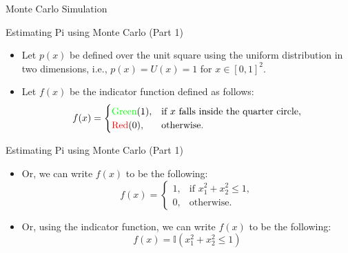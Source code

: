\documentclass{beamer}
\begin{document}
\begin{section}{Monte Carlo Simulation}
\begin{frame}[fragile]{Estimating Pi using Monte Carlo (Part 1)}
        \begin{itemize}
            \item Let $p(x)$ be defined over the unit square using the uniform distribution in two dimensions, i.e., $p(x) = U(x) = 1$ for $x \in [0, 1]^2$.
            \item Let $f(x)$ be the indicator function defined as follows:
                \[
                f(x) = \begin{cases}
                            \text{\textcolor{green}{Green}} (1), & \text{if } x \text{ falls inside the quarter circle}, \\
                            \text{\textcolor{red}{Red}} (0), & \text{otherwise}.
                       \end{cases}
                \]
        \end{itemize}
    \end{frame}

    \begin{frame}[fragile]{Estimating Pi using Monte Carlo (Part 1)}

        \begin{itemize}
        \item Or, we can write $f(x)$ to be the following:
            \[
            f(x) = \begin{cases}
                        1, & \text{if } x_1^2 + x_2^2 \leq 1, \\
                        0, & \text{otherwise}.
                   \end{cases}
            \]
        \item Or, using the indicator function, we can write $f(x)$ to be the following:
            \[
            f(x) = \mathbb{I}(x_1^2 + x_2^2 \leq 1)
            \]
        \end{itemize}
        
        \begin{center}
\end{center}
\end{frame}
\end{section}
\end{document}

